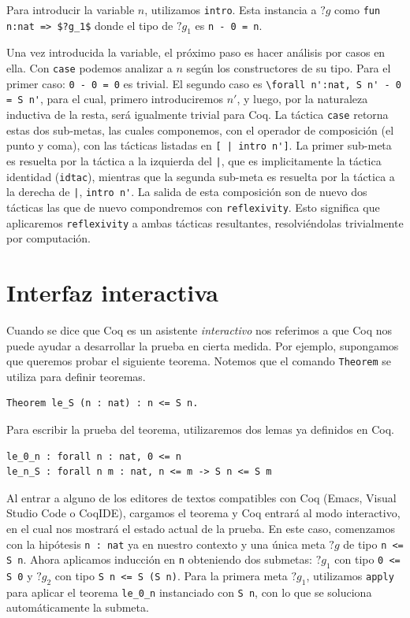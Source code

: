 Para introducir la variable $n$, utilizamos \lstinline{intro}. Esta instancia a $?g$ como \lstinline{fun n:nat => $?g_1$} donde el tipo de $?g_1$ es \lstinline{n - 0 = n}.

Una vez introducida la variable, el próximo paso es hacer análisis por casos en ella. Con \lstinline{case} podemos analizar a $n$ según los constructores de su tipo. Para el primer caso: \lstinline{0 - 0 = 0} es trivial. El segundo caso es \lstinline{\forall n':nat, S n' - 0 = S n'}, para el cual, primero introduciremos $n'$, y luego, por la naturaleza inductiva de la resta, será igualmente trivial para Coq. La táctica \lstinline{case} retorna estas dos sub-metas, las cuales componemos, con el operador de composición (el punto y coma), con las tácticas listadas en \lstinline{[ | intro n']}. La primer sub-meta es resuelta por la táctica a la izquierda del \lstinline{|}, que es implicitamente la táctica identidad (\lstinline{idtac}), mientras que la segunda sub-meta es resuelta por la táctica a la derecha de \lstinline{|}, \lstinline{intro n'}. La salida de esta composición son de nuevo dos tácticas las que de nuevo compondremos con \lstinline{reflexivity}. Esto significa que aplicaremos \lstinline{reflexivity} a ambas tácticas resultantes, resolviéndolas trivialmente por computación.

\section{Interfaz interactiva}

Cuando se dice que Coq es un asistente \textit{interactivo} nos referimos a que Coq nos puede ayudar a desarrollar la prueba en cierta medida.
Por ejemplo, supongamos que queremos probar el siguiente teorema.
Notemos que el comando \lstinline{Theorem} se utiliza para definir teoremas.

\begin{lstlisting}[frame=tb,caption={Teorema ejemplo},label=lst:le_S]
Theorem le_S (n : nat) : n <= S n.
\end{lstlisting}

Para escribir la prueba del teorema, utilizaremos dos lemas ya definidos en Coq.

\begin{lstlisting}[frame=tb,caption={Teoremas \lstinline{le_0_n} y \lstinline{le_n_S}}]
le_0_n : forall n : nat, 0 <= n
le_n_S : forall n m : nat, n <= m -> S n <= S m
\end{lstlisting}

Al entrar a alguno de los editores de textos compatibles con Coq (Emacs, Visual Studio Code o CoqIDE), cargamos el teorema y Coq entrará al modo interactivo, en el cual nos mostrará el estado actual de la prueba.
En este caso, comenzamos con la hipótesis \lstinline{n : nat} ya en nuestro contexto y una única meta $?g$ de tipo \lstinline{n <= S n}.
Ahora aplicamos inducción en \lstinline{n} obteniendo dos submetas: $?g_1$ con tipo \lstinline{0 <= S 0} y $?g_2$ con tipo \lstinline{S n <= S (S n)}.
Para la primera meta $?g_1$, utilizamos \lstinline{apply} para aplicar el teorema \lstinline{le_0_n} instanciado con \lstinline{S n}, con lo que se soluciona automáticamente la submeta.

